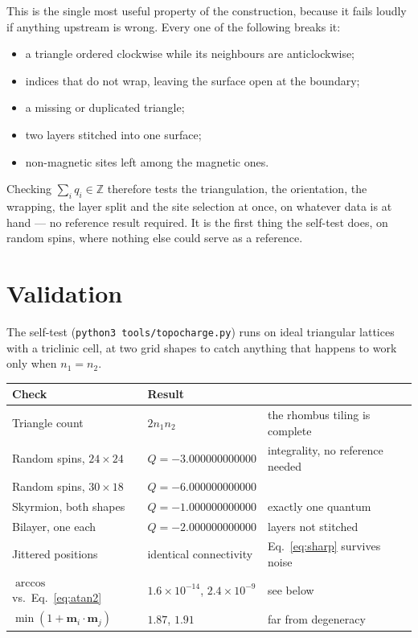 \documentclass[12pt, a4paper, oneside]{article}
\newcommand{\mvec}{\mathbf{m}}
\begin{document}
This is the single most useful property of the construction, because it fails
loudly if anything upstream is wrong. Every one of the following breaks it:

\begin{itemize}
    \item a triangle ordered clockwise while its neighbours are anticlockwise;
    \item indices that do not wrap, leaving the surface open at the boundary;
    \item a missing or duplicated triangle;
    \item two layers stitched into one surface;
    \item non-magnetic sites left among the magnetic ones.
\end{itemize}

Checking $\sum_i q_i \in \mathbb{Z}$ therefore tests the triangulation, the
orientation, the wrapping, the layer split and the site selection at once, on
whatever data is at hand --- no reference result required. It is the first thing
the self-test does, on random spins, where nothing else could serve as a
reference.

\section{Validation}
\label{sec:validation}

The self-test (\texttt{python3 tools/topocharge.py}) runs on ideal triangular
lattices with a triclinic cell, at two grid shapes to catch anything that
happens to work only when $n_1 = n_2$.

\begin{center}
\begin{tabular}{lll}
    \toprule
    Check & Result & \\
    \midrule
    Triangle count & $2n_1n_2$ & the rhombus tiling is complete \\
    Random spins, $24\times24$ & $Q = -3.000000000000$ & integrality, no reference needed \\
    Random spins, $30\times18$ & $Q = -6.000000000000$ & \\
    Skyrmion, both shapes & $Q = -1.000000000000$ & exactly one quantum \\
    Bilayer, one each & $Q = -2.000000000000$ & layers not stitched \\
    Jittered positions & identical connectivity & Eq.~\eqref{eq:sharp} survives noise \\
    $\arccos$ vs.\ Eq.~\eqref{eq:atan2} & $1.6\times10^{-14}$, $2.4\times10^{-9}$ & see below \\
    $\min(1+\mvec_i\cdot\mvec_j)$ & $1.87$, $1.91$ & far from degeneracy \\
    \bottomrule
\end{tabular}
\end{center}
\end{document}
